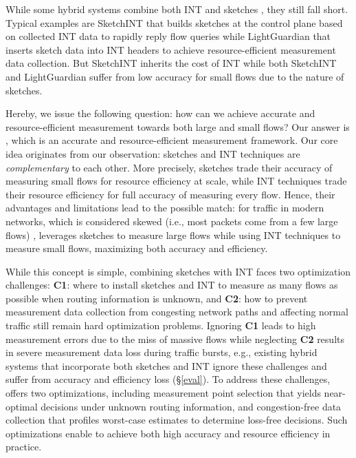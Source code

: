 While some hybrid systems combine both INT and sketches \cite{yang2023sketchint,zhao2021lightguardian}, they still fall short. Typical examples are SketchINT \cite{yang2023sketchint} that builds sketches at the control plane based on collected INT data to rapidly reply flow queries while LightGuardian \cite{zhao2021lightguardian} that inserts sketch data into INT headers to achieve resource-efficient measurement data collection. But SketchINT inherits the cost of INT while both SketchINT and LightGuardian suffer from low accuracy for small flows due to the nature of sketches. 

Hereby, we issue the following question: how can we achieve accurate and resource-efficient measurement towards both large and small flows? Our answer is \sysname, which is an accurate and resource-efficient measurement framework. Our core idea originates from our observation: sketches and INT techniques are \emph{complementary} to each other. More precisely, sketches trade their accuracy of measuring small flows for resource efficiency at scale, while INT techniques trade their resource efficiency for full accuracy of measuring every flow. Hence, their advantages and limitations lead to the possible match: for traffic in modern networks, which is considered skewed (i.e., most packets come from a few large flows) \cite{roy2015inside,huang2021toward,caida,benson2010network,yang2018elastic}, \sysname leverages sketches to measure large flows while using INT techniques to measure small flows, maximizing both accuracy and efficiency.

While this concept is simple, combining sketches with INT faces two optimization challenges: \textbf{C1}: where to install sketches and INT to measure as many flows as possible when routing information is unknown, and \textbf{C2}: how to prevent measurement data collection from congesting network paths and affecting normal traffic still remain hard optimization problems. Ignoring \textbf{C1} leads to high measurement errors due to the miss of massive flows while neglecting \textbf{C2} results in severe measurement data loss during traffic bursts, e.g., existing hybrid systems \cite{yang2023sketchint,zhao2021lightguardian} that incorporate both sketches and INT ignore these challenges and suffer from accuracy and efficiency loss (\S\ref{eval}). To address these challenges, \sysname offers two optimizations, including measurement point selection that yields near-optimal decisions under unknown routing information, and congestion-free data collection that profiles worst-case estimates to determine loss-free decisions. Such optimizations enable \sysname to achieve both high accuracy and resource efficiency in practice. 

